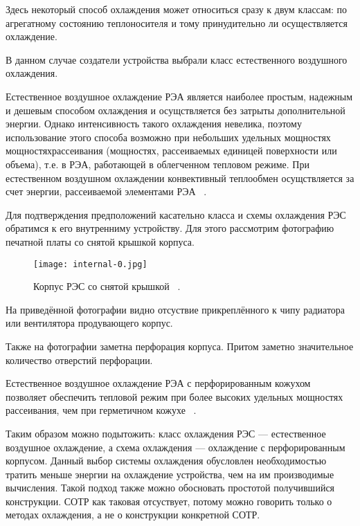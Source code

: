 Здесь некоторый способ охлаждения может относиться сразу к двум
классам: по агрегатному состоянию теплоносителя и тому принудительно
ли осуществляется охлаждение.

В данном случае создатели устройства выбрали класс естественного
воздушного охлаждения.

Естественное воздушное охлаждение РЭА является наиболее простым,
надежным и дешевым способом охлаждения и осущствляется без затрыты
дополнительной энергии. Однако интенсивность такого охлаждения
невелика, поэтому использование этого способа возможно при небольших
удельных мощностях мощностяхрассеивания (мощностях, рассеиваемых
единицей поверхности или объема), т.е. в РЭА, работающей в облегченном
тепловом режиме. При естественном воздушном охлаждении конвективный
теплообмен осущствляется за счет энергии, рассеиваемой элементами РЭА ~\cite{Rotkop1976}.

Для подтверждения предположений касательно класса и схемы охлаждения
РЭС обратимся к его внутренниму устройству. Для этого рассмотрим
фотографию печатной платы со снятой крышкой корпуса.

\begin{figure}[hb]
  \centering
  \texttt{[image: internal-0.jpg]}
  \caption{Корпус РЭС со снятой крышкой ~\cite{INTERNAL_PHOTOS}.}
\end{figure}

На приведённой фотографии видно отсуствие прикреплённого к чипу
радиатора или вентилятора продувающего корпус.

Также на фотографии заметна перфорация корпуса. Притом заметно
значительное количество отверстий перфорации.

Естественное воздушное охлаждение РЭА с перфорированным кожухом
позволяет обеспечить тепловой режим при более высоких удельных
мощностях рассеивания, чем при герметичном кожухе ~\cite{Rotkop1976}.

Таким образом можно подытожить: класс охлаждения РЭС — естественное
воздушное охлаждение, а схема охлаждения — охлаждение с
перфорированным корпусом. Данный выбор системы охлаждения обусловлен
необходимостью тратить меньше энергии на охлаждение устройства, чем на
им производимые вычисления. Такой подход также можно обосновать
простотой получившийся конструкции. СОТР как таковая отсуствует,
потому можно говорить только о методах охлаждения, а не о конструкции
конкретной СОТР.

\newpage
